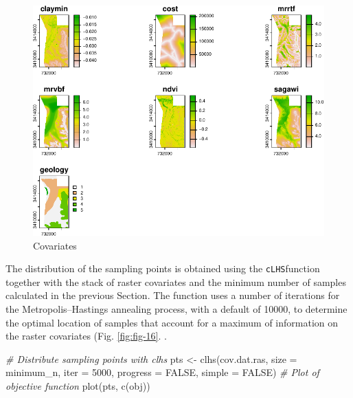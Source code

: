 \documentclass[
  10pt,
  b5paper,
  oneside]{book}
\newenvironment{Shaded}{\begin{snugshade}}{\end{snugshade}}
\newcommand{\AttributeTok}[1]{\textcolor[rgb]{0.77,0.63,0.00}{#1}}
\newcommand{\CommentTok}[1]{\textcolor[rgb]{0.56,0.35,0.01}{\textit{#1}}}
\newcommand{\ConstantTok}[1]{\textcolor[rgb]{0.00,0.00,0.00}{#1}}
\newcommand{\DecValTok}[1]{\textcolor[rgb]{0.00,0.00,0.81}{#1}}
\newcommand{\FunctionTok}[1]{\textcolor[rgb]{0.00,0.00,0.00}{#1}}
\newcommand{\NormalTok}[1]{#1}
\newcommand{\OtherTok}[1]{\textcolor[rgb]{0.56,0.35,0.01}{#1}}
\newcommand{\StringTok}[1]{\textcolor[rgb]{0.31,0.60,0.02}{#1}}
\begin{document}
\begin{figure}
\centering
\includegraphics{Technical-Manual-Soil-Sampling-Design_files/figure-latex/fig-15-1.pdf}
\caption{\label{fig:fig-15}Covariates}
\end{figure}

The distribution of the sampling points is obtained using the \texttt{\textquotesingle{}cLHS\textquotesingle{}}function together with the stack of raster covariates and the minimum number of samples calculated in the previous Section. The function uses a number of iterations for the Metropolis--Hastings annealing process, with a default of 10000, to determine the optimal location of samples that account for a maximum of information on the raster covariates (Fig. \ref{fig:fig-16}. .

\begin{Shaded}
\begin{Highlighting}[]
  \CommentTok{\# Distribute sampling points with clhs}
\NormalTok{  pts }\OtherTok{\textless{}{-}} \FunctionTok{clhs}\NormalTok{(cov.dat.ras, }\AttributeTok{size =}\NormalTok{ minimum\_n, }\AttributeTok{iter =} \DecValTok{5000}\NormalTok{, }\AttributeTok{progress =} \ConstantTok{FALSE}\NormalTok{, }\AttributeTok{simple =} \ConstantTok{FALSE}\NormalTok{)}
  \CommentTok{\# Plot of objective function}
  \FunctionTok{plot}\NormalTok{(pts, }\FunctionTok{c}\NormalTok{(}\StringTok{\textquotesingle{}obj\textquotesingle{}}\NormalTok{))}
\end{Highlighting}
\end{Shaded}
\end{document}
